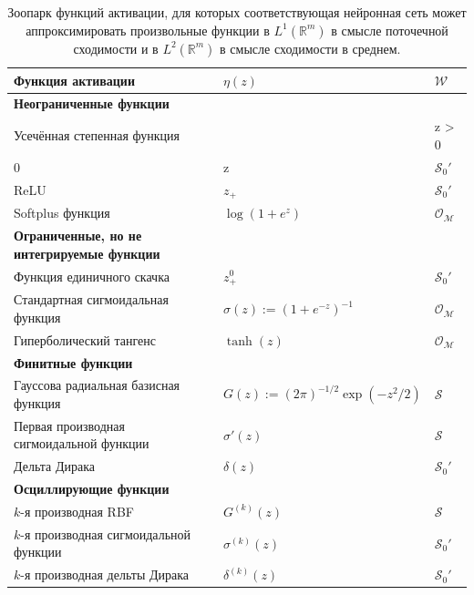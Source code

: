 \documentclass[12pt]{article}
\begin{document}
\begin{table}[h]
	\centering
	\caption{Зоопарк функций активации, для которых соответствующая нейронная сеть может аппроксимировать произвольные функции в \( L^1(\mathbb{R}^m) \) в смысле поточечной сходимости и в \( L^2(\mathbb{R}^m) \) в смысле сходимости в среднем.}
	\label{tab:activation_zoo}
	\begin{tabular}{lll}
		\toprule
		\textbf{Функция активации} & \( \eta(z) \) & \( \mathcal{W} \) \\
		\midrule
		\textbf{Неограниченные функции} & & \\
		Усечённая степенная функция & \( z_+^k := \left\{ \begin{array}{ll} z^k & z > 0 \\ 0 & z \leq 0 \end{array} \right. \), \( k \in \mathbb{N}_0 \) & \( \mathcal{S}_0' \) \\
		ReLU & \( z_+ \) & \( \mathcal{S}_0' \) \\
		Softplus функция & \( \log(1 + e^z) \) & \( \mathcal{O}_{\mathcal{M}} \) \\
		\midrule
		\textbf{Ограниченные, но не интегрируемые функции} & & \\
		Функция единичного скачка & \( z_+^0 \) & \( \mathcal{S}_0' \) \\
		Стандартная сигмоидальная функция & \( \sigma(z) := (1 + e^{-z})^{-1} \) & \( \mathcal{O}_{\mathcal{M}} \) \\
		Гиперболический тангенс & \( \tanh(z) \) & \( \mathcal{O}_{\mathcal{M}} \) \\
		\midrule
		\textbf{Финитные функции} & & \\
		Гауссова радиальная базисная функция & \( G(z) := (2\pi)^{-1/2} \exp(-z^2/2) \) & \( \mathcal{S} \) \\
		Первая производная сигмоидальной функции & \( \sigma'(z) \) & \( \mathcal{S} \) \\
		Дельта Дирака & \( \delta(z) \) & \( \mathcal{S}_0' \) \\
		\midrule
		\textbf{Осциллирующие функции} & & \\
		\( k\)-я производная RBF & \( G^{(k)}(z) \) & \( \mathcal{S} \) \\
		\( k\)-я производная сигмоидальной функции & \( \sigma^{(k)}(z) \) & \( \mathcal{S}_0' \) \\
		\( k\)-я производная дельты Дирака & \( \delta^{(k)}(z) \) & \( \mathcal{S}_0' \) \\
		\bottomrule
	\end{tabular}
\end{table}
\end{document}
